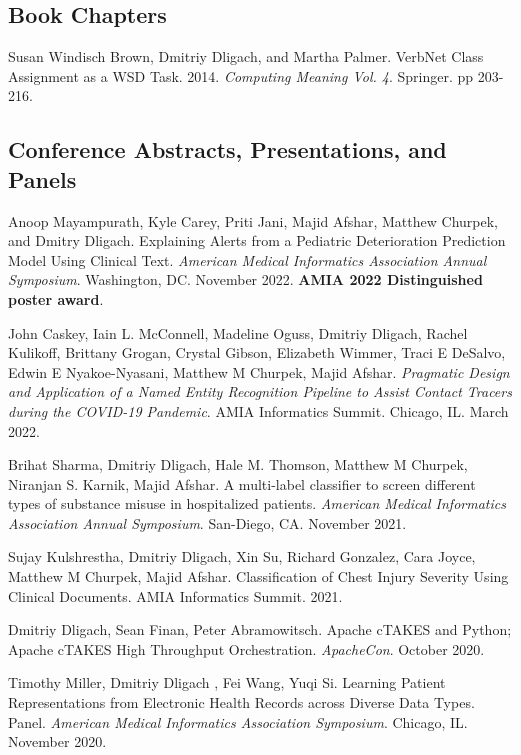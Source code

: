 \documentclass[letterpaper]{article}
\renewenvironment{itemize}{
  \begin{list}{}{
    \setlength{\leftmargin}{1.5em}
  }
}{
  \end{list}
}
\begin{document}
\subsection*{Book Chapters}
\begin{itemize}
\item Susan Windisch Brown, Dmitriy Dligach, and Martha Palmer. VerbNet Class Assignment as a WSD Task. 2014. \emph{Computing Meaning Vol. 4}. Springer. pp 203-216.
\end{itemize}

\subsection*{Conference Abstracts, Presentations, and Panels}
\begin{itemize}
\item Anoop Mayampurath, Kyle Carey, Priti Jani, Majid Afshar, Matthew Churpek, and Dmitry Dligach. Explaining Alerts from a Pediatric Deterioration Prediction Model Using Clinical Text. \emph{American Medical Informatics Association Annual Symposium}. Washington, DC. November 2022. \textbf{AMIA 2022 Distinguished poster award}.
\item John Caskey, Iain L. McConnell, Madeline Oguss, Dmitriy Dligach, Rachel Kulikoff,  Brittany Grogan, Crystal Gibson, Elizabeth Wimmer, Traci E DeSalvo, Edwin E Nyakoe-Nyasani, Matthew M Churpek, Majid Afshar. \emph{Pragmatic Design and Application of a Named Entity Recognition Pipeline to Assist Contact Tracers during the COVID-19 Pandemic}. AMIA Informatics Summit. Chicago, IL. March 2022.
\item Brihat Sharma, Dmitriy Dligach, Hale M. Thomson, Matthew M Churpek, Niranjan S. Karnik, Majid Afshar. A multi-label classifier to screen different types of substance misuse in hospitalized patients. \emph{American Medical Informatics Association Annual Symposium}. San-Diego, CA. November 2021.
\item Sujay Kulshrestha, Dmitriy Dligach, Xin Su, Richard Gonzalez, Cara Joyce, Matthew M Churpek, Majid Afshar. Classification of Chest Injury Severity Using Clinical Documents. AMIA Informatics Summit. 2021.
\item Dmitriy Dligach, Sean Finan, Peter Abramowitsch. Apache cTAKES and Python; Apache cTAKES High Throughput Orchestration. \emph{ApacheCon}. October 2020.
\item Timothy Miller, Dmitriy Dligach , Fei Wang, Yuqi Si. Learning Patient Representations from Electronic Health Records across Diverse Data Types. Panel. \emph{American Medical Informatics Association Symposium}. Chicago, IL. November 2020.

\end{itemize}
\end{document}
